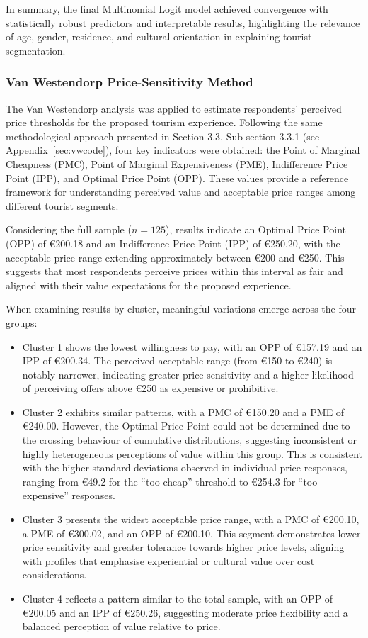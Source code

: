 \documentclass[a4paper, 12pt, twoside]{report}  %
\begin{document}
\indent In summary, the final Multinomial Logit model achieved convergence with statistically robust predictors and interpretable results, highlighting the relevance of age, gender, residence, and cultural orientation in explaining tourist segmentation.

\subsubsection{Van Westendorp Price-Sensitivity Method}

\indent The Van Westendorp analysis was applied to estimate respondents’ perceived price thresholds for the proposed tourism experience. Following the same methodological approach presented in Section 3.3, Sub-section 3.3.1 (see Appendix~\ref{sec:vwcode}), four key indicators were obtained: the Point of Marginal Cheapness (PMC), Point of Marginal Expensiveness (PME), Indifference Price Point (IPP), and Optimal Price Point (OPP). These values provide a reference framework for understanding perceived value and acceptable price ranges among different tourist segments.

\indent Considering the full sample ($n = 125$), results indicate an Optimal Price Point (OPP) of €200.18 and an Indifference Price Point (IPP) of €250.20, with the acceptable price range extending approximately between €200 and €250. This suggests that most respondents perceive prices within this interval as fair and aligned with their value expectations for the proposed experience.

\indent When examining results by cluster, meaningful variations emerge across the four groups:

\begin{itemize}
\item Cluster 1 shows the lowest willingness to pay, with an OPP of €157.19 and an IPP of €200.34. The perceived acceptable range (from €150 to €240) is notably narrower, indicating greater price sensitivity and a higher likelihood of perceiving offers above €250 as expensive or prohibitive.
\item Cluster 2 exhibits similar patterns, with a PMC of €150.20 and a PME of €240.00. However, the Optimal Price Point could not be determined due to the crossing behaviour of cumulative distributions, suggesting inconsistent or highly heterogeneous perceptions of value within this group. This is consistent with the higher standard deviations observed in individual price responses, ranging from €49.2 for the “too cheap” threshold to €254.3 for “too expensive” responses.
\item Cluster 3 presents the widest acceptable price range, with a PMC of €200.10, a PME of €300.02, and an OPP of €200.10. This segment demonstrates lower price sensitivity and greater tolerance towards higher price levels, aligning with profiles that emphasise experiential or cultural value over cost considerations.
\item Cluster 4 reflects a pattern similar to the total sample, with an OPP of €200.05 and an IPP of €250.26, suggesting moderate price flexibility and a balanced perception of value relative to price.
\end{itemize}
\end{document}
